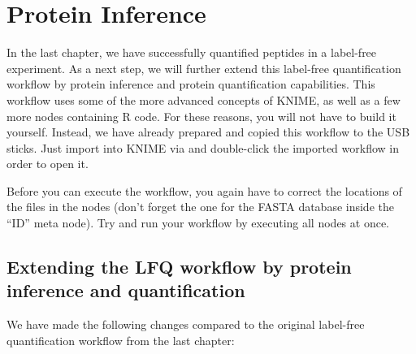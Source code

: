 \section{Protein Inference}

In the last chapter, we have successfully quantified peptides in a label-free experiment. As a next step, we will
further extend this label-free quantification workflow by protein inference and protein quantification capabilities.
This workflow uses some of the more advanced concepts of KNIME, as well as a few more nodes containing R code.
For these reasons, you will not have to build it yourself. Instead, we have already
prepared and copied this workflow to the USB sticks. Just import  into KNIME
via  and double-click the imported workflow in order to open it.

Before you can execute the workflow, you again have to correct the locations of the files in the  nodes (don't forget the one for the FASTA database inside the ``ID'' meta node). Try and run your workflow by 
executing all nodes at once.

\subsection{Extending the LFQ workflow by protein inference and quantification}

We have made the following changes compared to the original label-free quantification workflow from the last chapter:

